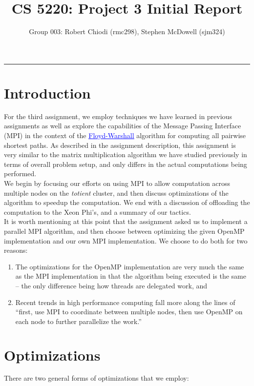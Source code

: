 \documentclass[11pt]{article}
\title{CS 5220: Project 3 Initial Report}
\author{Group 003: Robert Chiodi (rmc298), Stephen McDowell (sjm324)}
\makeatletter
\renewcommand{\maketitle}{\bgroup\setlength{\parindent}{0pt}
\begin{flushleft}
  {\Large \textsc{\@title}}\newline
  \textsc{\@author}
  \rule{\textwidth}{1pt}
\end{flushleft}\egroup
}
\makeatother
\begin{document}
\thispagestyle{empty}
\maketitle

\section{Introduction}
For the third assignment, we employ techniques we have learned in previous assignments as well as explore the capabilities of the Message Passing Interface (MPI) in the context of the \href{https://en.wikipedia.org/wiki/Floyd\%E2\%80\%93Warshall_algorithm}{\textcolor{blue}{\underline{Floyd-Warshall}}} algorithm for computing all pairwise shortest paths.  As described in the assignment description, this assignment is very similar to the matrix multiplication algorithm we have studied previously in terms of overall problem setup, and only differs in the actual computations being performed.\\

\noindent We begin by focusing our efforts on using MPI to allow computation across multiple nodes on the \emph{totient} cluster, and then discuss optimizations of the algorithm to speedup the computation.  We end with a discussion of offloading the computation to the Xeon Phi's, and a summary of our tactics.\\

\noindent It is worth mentioning at this point that the assignment asked us to implement a parallel MPI algorithm, and then choose between optimizing the given OpenMP implementation and our own MPI implementation.  We choose to do both for two reasons:

\begin{enumerate}[1.]
  \item The optimizations for the OpenMP implementation are very much the same as the MPI implementation in that the algorithm being executed is the same -- the only difference being how threads are delegated work, and
  \item Recent trends in high performance computing fall more along the lines of ``first, use MPI to coordinate between multiple nodes, then use OpenMP on each node to further parallelize the work.''
\end{enumerate}

\section{Optimizations}
There are two general forms of optimizations that we employ:
\end{document}

